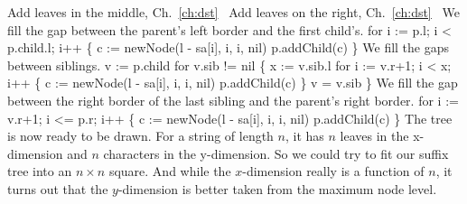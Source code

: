 \LA{}Add leaves in the middle, Ch.~\ref{ch:dst}~{\nwtagstyle{}}\RA{}
\LA{}Add leaves on the right, Ch.~\ref{ch:dst}~{\nwtagstyle{}}\RA{}
\nwendcode{}\nwdocspar
We fill the gap between the parent's left border and the first
child's.
\nwenddocs{}\endmoddef\nwstartdeflinemarkup{}\nwenddeflinemarkup
for i := p.l; i < p.child.l; i++ \{
          c := newNode(l - sa[i], i, i, nil)
          p.addChild(c)
\}
\nwendcode{}\nwdocspar
We fill the gaps between siblings.
\nwenddocs{}\endmoddef\nwstartdeflinemarkup{}\nwenddeflinemarkup
v := p.child
for v.sib != nil \{
          x := v.sib.l
          for i := v.r+1; i < x; i++ \{
                  c := newNode(l - sa[i], i, i, nil)
                  p.addChild(c)
          \}
          v = v.sib
\}
\nwendcode{}\nwdocspar
We fill the gap between the right border of the last sibling and the
parent's right border.
\nwenddocs{}\endmoddef\nwstartdeflinemarkup{}\nwenddeflinemarkup
for i := v.r+1; i <= p.r; i++ \{
          c := newNode(l - sa[i], i, i, nil)
          p.addChild(c)
\}
\nwendcode{}\nwdocspar
The tree is now ready to be drawn. For a string of length $n$, it has
$n$ leaves in the x-dimension and $n$ characters in the
y-dimension. So we could try to fit our suffix tree into an $n\times
n$ square. And while the $x$-dimension really is a function of $n$, it
turns out that the $y$-dimension is better taken from the maximum node
level.

